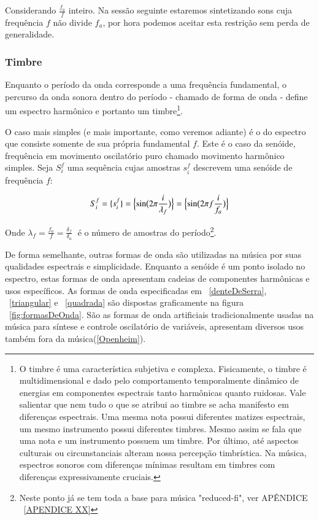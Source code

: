 Considerando $\frac{f_a}{f}$ inteiro. Na sessão seguinte estaremos sintetizando sons cuja frequência $f$ não divide $f_a$, por hora podemos aceitar esta restrição sem perda de generalidade.

\subsubsection{Timbre}
Enquanto o período da onda corresponde a uma frequência fundamental, o percurso
da onda sonora dentro do período - chamado de forma de onda - define um espectro harmônico e portanto
um timbre\footnote{O timbre é uma característica subjetiva e complexa. Fisicamente,
o timbre é multidimensional e dado pelo comportamento temporalmente dinâmico
de energias em componentes espectrais tanto harmônicas quanto ruidosas.  Vale salientar que nem tudo
o que se atribui ao timbre se acha manifesto em diferenças espectrais. Uma mesma nota
possui diferentes matizes espectrais, um mesmo instrumento possui diferentes timbres. Mesmo
assim se fala que uma nota e um instrumento possuem um timbre. Por último, até
aspectos culturais ou circunstanciais alteram nossa percepção timbrística.
Na música, espectros
sonoros com diferenças mínimas resultam em
 timbres com diferenças expressivamente cruciais.
}.

O caso mais simples (e mais importante, como veremos adiante) é o do espectro que consiste somente
de sua própria fundamental $f$. Este é o caso da senóide, frequência em movimento oscilatório puro chamado
movimento harmônico simples. Seja $S_i^f$ uma sequência cujas amostras
$s_i^f$ descrevem uma senóide de frequência $f$:

\begin{equation}\label{senoide}
     S^f_i=\{ s^f_i \}=\Bigl\{ \sin\bigl(2\pi \frac{i}{\lambda_f} \bigr)  \Bigr\} = \Bigl\{ \sin\bigl(2\pi f \frac{i}{f_a}\bigr)  \Bigr\} 
\end{equation}

Onde $\lambda_f=\frac{f_a}{f}=\frac{\delta_f}{\delta_a} \;$ é o número de amostras do período\footnote{Neste ponto já se tem toda a base para música "reduced-fi", ver APÊNDICE ~\ref{APENDICE XX}}.

De forma semelhante, outras formas de onda são utilizadas na música por suas qualidades
espectrais e simplicidade. Enquanto a senóide é um ponto isolado no espectro, estas formas
de onda apresentam cadeias de componentes harmônicas e usos específicos.
As formas de onda especificadas em ~\ref{denteDeSerra}, ~\ref{triangular} e ~\ref{quadrada} são dispostas graficamente na figura ~\ref{fig:formasDeOnda}. 
São as formas de onda artificiais tradicionalmente usadas na música para síntese e controle oscilatório de variáveis, apresentam diversos usos também fora da música(\ref{Openheim}).

